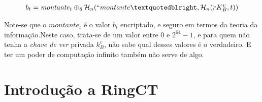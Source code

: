 \begin{align*}
b_t = \mathit{montante}_t \oplus_8 \mathcal{H}_n(``montante”, \mathcal{H}_n(r K_B^v, t))
\end{align*}

Note-se que o $\mathit{montante}_t$ é o valor $b_t$ encriptado, e seguro em termos da teoria da informação.\newline Neste caso, trata-se de um valor entre 0 e $2^{64}-1$, e para quem não tenha a {\em chave de ver} privada $k_B^v$, não sabe qual desses valores é o verdadeiro. E ter um poder de computação infinito também não serve de algo.   








\section{Introdução a RingCT}
\label{sec:ringct-introduction}


